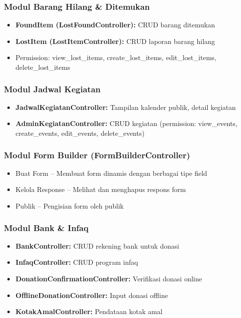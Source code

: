 \documentclass[12pt,a4paper]{article}
\begin{document}
\subsubsection{Modul Barang Hilang \& Ditemukan}
\begin{itemize}
    \item \textbf{FoundItem (LostFoundController):} CRUD barang ditemukan
    \item \textbf{LostItem (LostItemController):} CRUD laporan barang hilang
    \item Permission: view\_lost\_items, create\_lost\_items, edit\_lost\_items, delete\_lost\_items
\end{itemize}

\subsubsection{Modul Jadwal Kegiatan}
\begin{itemize}
    \item \textbf{JadwalKegiatanController:} Tampilan kalender publik, detail kegiatan
    \item \textbf{AdminKegiatanController:} CRUD kegiatan (permission: view\_events, create\_events, edit\_events, delete\_events)
\end{itemize}

\subsubsection{Modul Form Builder (FormBuilderController)}
\begin{itemize}
    \item Buat Form -- Membuat form dinamis dengan berbagai tipe field
    \item Kelola Response -- Melihat dan menghapus respons form
    \item Publik -- Pengisian form oleh publik
\end{itemize}

\subsubsection{Modul Bank \& Infaq}
\begin{itemize}
    \item \textbf{BankController:} CRUD rekening bank untuk donasi
    \item \textbf{InfaqController:} CRUD program infaq
    \item \textbf{DonationConfirmationController:} Verifikasi donasi online
    \item \textbf{OfflineDonationController:} Input donasi offline
    \item \textbf{KotakAmalController:} Pendataan kotak amal
\end{itemize}
\end{document}
